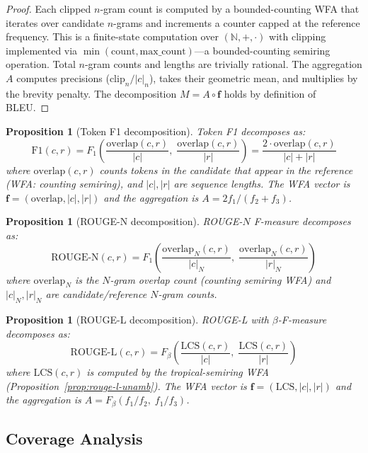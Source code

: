 \documentclass[11pt]{article}
\newtheorem{proposition}[theorem]{Proposition}
\newcommand{\N}{\mathbb{N}}
\begin{document}
\begin{proof}
Each clipped $n$-gram count is computed by a bounded-counting WFA that
iterates over candidate $n$-grams and increments a counter capped at
the reference frequency.  This is a finite-state computation over
$(\N, +, \cdot)$ with clipping implemented via
$\min(\mathrm{count}, \mathrm{max\_count})$---a bounded-counting
semiring operation.  Total $n$-gram counts and lengths are trivially
rational.  The aggregation $A$ computes precisions ($\mathrm{clip}_n/|c|_n$),
takes their geometric mean, and multiplies by the brevity penalty.
The decomposition $M = A \circ \mathbf{f}$ holds by definition of BLEU.
\end{proof}

\begin{proposition}[Token F1 decomposition]\label{prop:f1-decomp}
Token F1 decomposes as:
\[
\mathrm{F1}(c, r) = F_1\!\left(
  \frac{\mathrm{overlap}(c,r)}{|c|},\;
  \frac{\mathrm{overlap}(c,r)}{|r|}\right)
  = \frac{2 \cdot \mathrm{overlap}(c,r)}{|c| + |r|}
\]
where $\mathrm{overlap}(c,r)$ counts tokens in the candidate that
appear in the reference (WFA: counting semiring), and $|c|, |r|$
are sequence lengths.  The WFA vector is
$\mathbf{f} = (\mathrm{overlap}, |c|, |r|)$ and the aggregation
is $A = 2f_1/(f_2 + f_3)$.
\end{proposition}

\begin{proposition}[ROUGE-N decomposition]\label{prop:rougen-decomp}
ROUGE-$N$ F-measure decomposes as:
\[
\mathrm{ROUGE\text{-}N}(c,r) = F_1\!\left(
  \frac{\mathrm{overlap}_N(c,r)}{|c|_N},\;
  \frac{\mathrm{overlap}_N(c,r)}{|r|_N}\right)
\]
where $\mathrm{overlap}_N$ is the $N$-gram overlap count (counting
semiring WFA) and $|c|_N, |r|_N$ are candidate/reference $N$-gram
counts.
\end{proposition}

\begin{proposition}[ROUGE-L decomposition]\label{prop:rougel-decomp}
ROUGE-L with $\beta$-F-measure decomposes as:
\[
\mathrm{ROUGE\text{-}L}(c,r) = F_\beta\!\left(
  \frac{\mathrm{LCS}(c,r)}{|c|},\;
  \frac{\mathrm{LCS}(c,r)}{|r|}\right)
\]
where $\mathrm{LCS}(c,r)$ is computed by the tropical-semiring WFA
(Proposition~\ref{prop:rouge-l-unamb}).  The WFA vector is
$\mathbf{f} = (\mathrm{LCS}, |c|, |r|)$ and the aggregation is
$A = F_\beta(f_1/f_2,\; f_1/f_3)$.
\end{proposition}

\subsection{Coverage Analysis}
\end{document}
